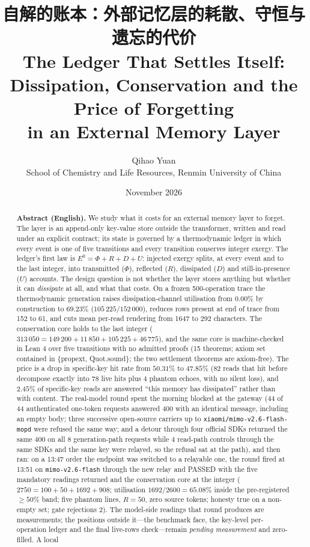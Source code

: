 \documentclass[11pt,a4paper]{article}
\title{\bfseries 自解的账本：外部记忆层的耗散、守恒与遗忘的代价\\[2pt]
\large The Ledger That Settles Itself: Dissipation, Conservation and the Price of Forgetting\\ in an External Memory Layer}
\author{Qihao Yuan \\ School of Chemistry and Life Resources, Renmin University of China}
\date{November 2026}
\newcommand{\Ezero}{E^{0}}
\begin{document}
\maketitle
\vspace{0.2em}
\vspace{0.2em}

\begin{abstract}
\noindent
\textbf{Abstract (English).}
We study what it costs for an external memory layer to forget. The layer is an append-only key-value store outside the transformer, written and read under an explicit contract; its state is governed by a thermodynamic ledger in which every event is one of five transitions and every transition conserves integer exergy. The ledger's first law is $\Ezero = \Phi + R + D + U$: injected exergy splits, at every event and to the last integer, into transmitted ($\Phi$), reflected ($R$), dissipated ($D$) and still-in-presence ($U$) accounts. The design question is not whether the layer stores anything but whether it can \emph{dissipate} at all, and what that costs. On a frozen 500-operation trace the thermodynamic generation raises dissipation-channel utilisation from $0.00\%$ by construction to $69.23\%$ ($105\,225 / 152\,000$), reduces rows present at end of trace from 152 to 61, and cuts mean per-read rendering from 1647 to 292 characters. The conservation core holds to the last integer ($313\,050 = 149\,200 + 11\,850 + 105\,225 + 46\,775$), and the same core is machine-checked in Lean 4 over five transitions with no admitted proofs (15 theorems; axiom set contained in \{propext, Quot.sound\}; the two settlement theorems are axiom-free). The price is a drop in specific-key hit rate from $50.31\%$ to $47.85\%$ (82 reads that hit before decompose exactly into 78 live hits plus 4 phantom echoes, with no silent loss), and $2.45\%$ of specific-key reads are answered ``this memory has dissipated'' rather than with content. The real-model round spent the morning blocked at the gateway (44 of 44 authenticated one-token requests answered 400 with an identical message, including an empty body; three successive open-source carriers up to \texttt{xiaomi/mimo-v2.6-flash-mopd} were refused the same way; and a detour through four official SDKs returned the same 400 on all 8 generation-path requests while 4 read-path controls through the same SDKs and the same key were relayed, so the refusal sat at the path), and then ran: on a 13:47 order the endpoint was switched to a relayable one, the round fired at 13:51 on \texttt{mimo-v2.6-flash} through the new relay and PASSED with the five mandatory readings returned and the conservation core at the integer ($2750 = 100 + 50 + 1692 + 908$; utilisation $1692/2600 = 65.08\%$ inside the pre-registered $\ge 50\%$ band; five phantom lines, $R = 50$, zero source tokens; honesty true on a non-empty set; gate rejections 2). The model-side readings that round produces are measurements; the positions outside it---the benchmark face, the key-level per-operation ledger and the final live-rows check---remain \emph{pending measurement} and zero-filled. A local 
\end{abstract}
\end{document}
